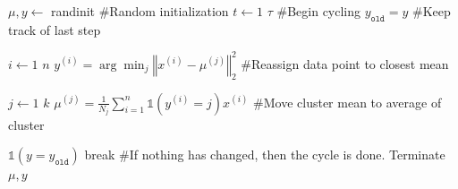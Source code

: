         \begin{codebox}
          \li $\mu, y \gets $ randinit  \qquad\#Random initialization
          \li \For $t \gets 1$ \To $\tau$   \qquad\#Begin cycling
          \li
          \li   \Do
                 $y_{\texttt{old}} = y$ \qquad\#Keep track of last step
                 
          \li
          \li        \For $i \gets 1$ \To $n$
          \li       \Do
                     $y^{(i)} = \arg\min_j \left\Vert x^{(i)} - \mu^{(j)} \right\Vert_2^2$
                     \qquad\#Reassign data point to closest mean
                    \End
                    
          \li
          \li    \For $j \gets 1$ \To $k$
          \li       \Do 
                     $\mu^{(j)} = \frac{1}{N_j} \sum_{i=1}^n \mathbb{1}(y^{(i)} = j) x^{(i)}$
                     \qquad\#Move cluster mean to average of cluster
                    \End
                    
        \li
          \li      \If $\mathbb{1}(y = y_{\texttt{old}})$
          \li          \Then
        		  break \qquad\#If nothing has changed, then the cycle is done. Terminate
              \End
              \End
          \li
          \li \Return $\mu, y$
        \end{codebox}